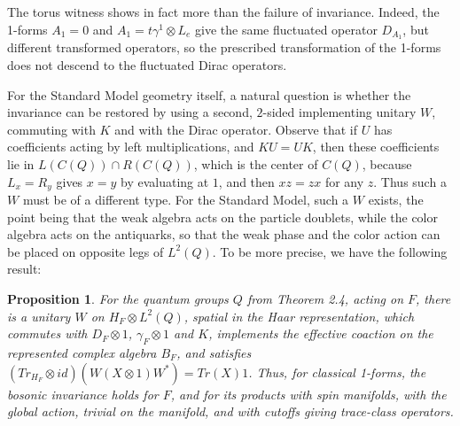 \documentclass[11pt]{amsart}
\newtheorem{proposition}[theorem]{Proposition}
\theoremstyle{definition}
\begin{document}
The torus witness shows in fact more than the failure of invariance. Indeed, the 1-forms $A_1=0$ and $A_1=t\gamma^1\otimes L_e$ give the same fluctuated operator $D_{A_1}$, but different transformed operators, so the prescribed transformation of the 1-forms does not descend to the fluctuated Dirac operators.

For the Standard Model geometry itself, a natural question is whether the invariance can be restored by using a second, $2$-sided implementing unitary $W$, commuting with $K$ and with the Dirac operator. Observe that if $U$ has coefficients acting by left multiplications, and $KU=UK$, then these coefficients lie in $L(C(Q))\cap R(C(Q))$, which is the center of $C(Q)$, because $L_x=R_y$ gives $x=y$ by evaluating at $1$, and then $xz=zx$ for any $z$. Thus such a $W$ must be of a different type. For the Standard Model, such a $W$ exists, the point being that the weak algebra acts on the particle doublets, while the color algebra acts on the antiquarks, so that the weak phase and the color action can be placed on opposite legs of $L^2(Q)$. To be more precise, we have the following result:

\begin{proposition}
For the quantum groups $Q$ from Theorem 2.4, acting on $F$, there is a unitary $W$ on $H_F\otimes L^2(Q)$, spatial in the Haar representation, which commutes with $D_F\otimes1$, $\gamma_F\otimes1$ and $K$, implements the effective coaction on the represented complex algebra $B_F$, and satisfies $(Tr_{H_F}\otimes id)(W(X\otimes1)W^*)=Tr(X)1$. Thus, for classical 1-forms, the bosonic invariance holds for $F$, and for its products with spin manifolds, with the global action, trivial on the manifold, and with cutoffs giving trace-class operators.
\end{proposition}
\end{document}
